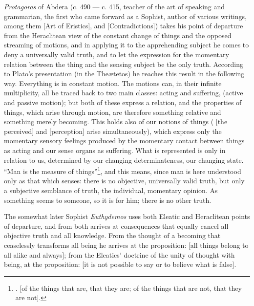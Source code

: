\emph{Protagoras} of Abdera (c. 490 --- c. 415, teacher of the art of
speaking and grammarian, the first who came forward as a Sophist, author of
various writings, among them  [Art of Eristics], and
 [Contradictions]) takes his point of departure from the
Heraclitean view of the constant change of things and the opposed streaming
of motions, and in applying it to the apprehending subject he comes to deny a
universally valid truth, and to let the expression for the momentary relation
between the thing and the sensing subject be the only truth. According to
Plato's presentation (in the Theætetos)
he reaches this result in the following way. Everything is in constant
motion. The motions can, in their infinite multiplicity, all be traced back
to two main classes: acting and suffering, (active and passive motion); but
both of these express a relation, and the properties of things, which arise
through motion, are therefore something relative and something merely
becoming. This holds also of our notions of things (
[the perceived] and  [perception] arise simultaneously), which
express only the momentary sensory feelings produced by the momentary contact
between things as acting and our sense organs as suffering. What is
represented is only in relation to us, determined by our changing
determinateness, our changing state. ``Man is the measure of
things''\footnote{.  [of the things that are, that they are; of the things that are not, that they are not].},
and this means, since man is here understood only as that which
senses: there is no objective, universally valid truth, but only a subjective
semblance of truth, the individual, momentary opinion. As something seems to
someone, so it is for him; there is no other truth.

The somewhat later Sophist \emph{Euthydemos} uses both Eleatic and
Heraclitean points of departure, and from both arrives at consequences that
equally cancel all objective truth and all knowledge. From the thought of a
becoming that ceaselessly transforms all being he arrives at the proposition:
 [all things belong to all alike and always]; from the Eleatics'
doctrine of the unity of thought with being, at the proposition:
 [it is not possible to say or to
believe what is false].

